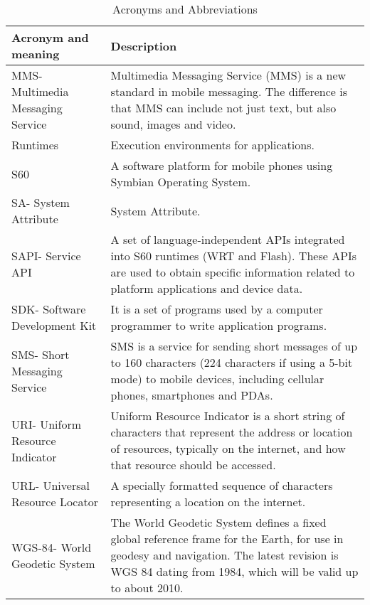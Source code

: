\begin{table}[htbp]
\begin{center}
\begin{tabular}{l|l}
\hline
{\bf Acronym and meaning} & {\bf Description}  \\
\hline
MMS- Multimedia Messaging Service & Multimedia Messaging Service (MMS) is a new standard in mobile messaging. The difference is that MMS can include not just text, but also sound, images and video.  \\
\hline
Runtimes & Execution environments for applications.  \\
\hline
S60 & A software platform for mobile phones using Symbian Operating System.  \\
\hline
SA- System Attribute & System Attribute.  \\
\hline
SAPI- Service API & A set of language-independent APIs integrated into S60 runtimes (WRT and Flash). These APIs are used to obtain specific information related to platform applications and device data.  \\
\hline
SDK- Software Development Kit & It is a set of programs used by a computer programmer to write application programs.  \\
\hline
SMS- Short Messaging Service & SMS is a service for sending short messages of up to 160 characters (224 characters if using a 5-bit mode) to mobile devices, including cellular phones, smartphones and PDAs.  \\
\hline
URI- Uniform Resource Indicator & Uniform Resource Indicator is a short string of characters that represent the address or location of resources, typically on the internet, and how that resource should be accessed.  \\
\hline
URL- Universal Resource Locator & A specially formatted sequence of characters representing a location on the internet.  \\
\hline
WGS-84- World Geodetic System & The World Geodetic System defines a fixed global reference frame for the Earth, for use in geodesy and navigation. The latest revision is WGS 84 dating from 1984, which will be valid up to about 2010.  \\
\end{tabular}
\caption{Acronyms and Abbreviations}
\end{center}
\end{table}














































